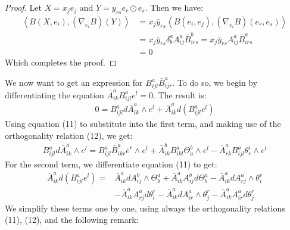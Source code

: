 \documentclass[11pt]{amsart}
\def \la { \left\langle }
\def \ra { \right\rangle }
\theoremstyle{definition}
\begin{document}
\begin{proof}  Let $X = x_j e_j$ and $Y = y_{rs} e_r \odot e_s$.  Then we have:
%
\begin{align*}
\la B( X, e_i ), (\nabla_{e_i} B) ( Y ) \ra &= x_j \bar{y}_{rs} \la B(e_i, e_j), ( \nabla_{e_i} B )( e_r, e_s ) \ra \\
&= x_j \bar{y}_{rs} \delta^a_b A^a_{ij} \bar{B}^b_{irs} = x_j \bar{y}_{rs} A^a_{ij} \bar{B}^a_{irs} \\
&= 0
\end{align*}
%
Which completes the proof.
%
\end{proof}

We now want to get an expression for $B^a_{ijl} \bar{B}^a_{ijr}$.  To do so, we begin by differentiating the equation $\bar{A}^a_{ik} B^a_{ijl} e^l = 0$.  The result is:
%
\begin{align*}
0 = B^a_{ijl} d \bar{A}^a_{ik} \wedge e^l + \bar{A}^a_{ik} d( B^a_{ijl} e^l ) 
\end{align*}
%
Using equation (11) to substitute into the first term, and making use of the orthogonality relation (12), we get:
%
\begin{align*}
B^a_{ijl} d \bar{A}^a_{ik} \wedge e^l= B^a_{ijl} \bar{B}^a_{ikr} \bar{e}^r \wedge e^l + \bar{A}^b_{ik} B^a_{ikl} \Theta^b_a \wedge e^l - \bar{A}^a_{rk} B^a_{ijl}  \theta^i_r \wedge e^l
\end{align*}
%
For the second term, we differentiate equation (11) to get:
%
\begin{align*}
\bar{A}^a_{ik} d( B^a_{ijl} e^l ) =& \bar{A}^a_{ik} d A^b_{ij} \wedge \Theta^a_b + \bar{A}^a_{ik} A^b_{ij} d \Theta^a_b - \bar{A}^a_{ik} d
A^a_{rj} \wedge \theta^r_i \\
&- \bar{A}^a_{ik} A^a_{rj} d \theta^r_i - \bar{A}^a_{ik} d A^a_{ir} \wedge \theta^r_j - \bar{A}^a_{ik} A^a_{ir} d \theta^r_j
\end{align*}
%
We simplify these terms one by one, using always the orthogonality relations (11), (12), and the following remark:
\end{document}

